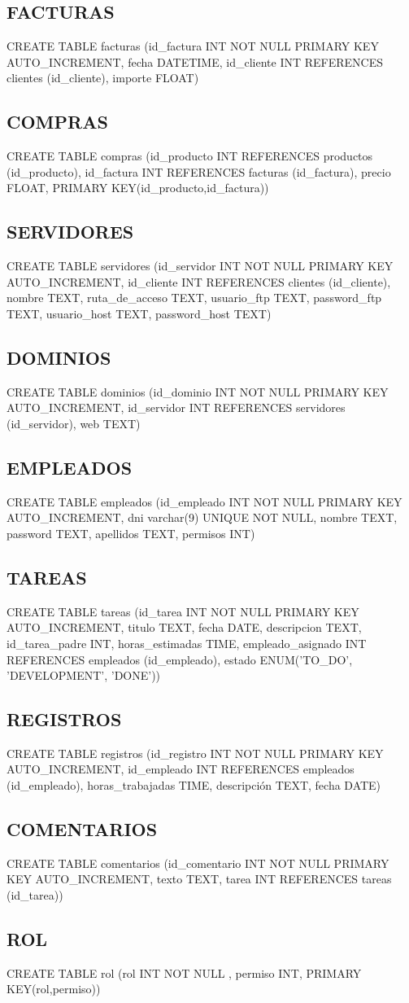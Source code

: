 \documentclass[paper=a4, fontsize=11pt, spanish]{scrartcl}
\begin{document}
\subsection{FACTURAS}
CREATE TABLE facturas (id\_factura INT NOT NULL PRIMARY KEY AUTO\_INCREMENT, fecha DATETIME, id\_cliente INT REFERENCES clientes (id\_cliente), importe FLOAT)

\subsection{COMPRAS}
CREATE TABLE compras (id\_producto INT REFERENCES productos (id\_producto), id\_factura INT REFERENCES facturas (id\_factura), precio FLOAT, PRIMARY KEY(id\_producto,id\_factura))

\subsection{SERVIDORES}
CREATE TABLE servidores (id\_servidor INT NOT NULL PRIMARY KEY AUTO\_INCREMENT, id\_cliente INT REFERENCES clientes (id\_cliente), nombre TEXT,  ruta\_de\_acceso TEXT, usuario\_ftp TEXT, password\_ftp TEXT, usuario\_host TEXT, password\_host TEXT)

\subsection{DOMINIOS}
CREATE TABLE dominios (id\_dominio INT NOT NULL PRIMARY KEY AUTO\_INCREMENT, id\_servidor INT REFERENCES servidores (id\_servidor), web TEXT)

\subsection{EMPLEADOS}
CREATE TABLE empleados (id\_empleado INT NOT NULL PRIMARY KEY AUTO\_INCREMENT, dni varchar(9) UNIQUE NOT NULL,  nombre TEXT, password TEXT, apellidos TEXT, permisos INT)

\subsection{TAREAS}
CREATE TABLE tareas (id\_tarea INT NOT NULL PRIMARY KEY AUTO\_INCREMENT, titulo TEXT, fecha DATE, descripcion TEXT, id\_tarea\_padre INT, horas\_estimadas TIME, empleado\_asignado INT REFERENCES empleados (id\_empleado), estado ENUM('TO_DO', 'DEVELOPMENT', 'DONE'))

\subsection{REGISTROS}
CREATE TABLE registros (id\_registro INT NOT NULL PRIMARY KEY AUTO\_INCREMENT, id\_empleado INT REFERENCES empleados (id\_empleado), horas\_trabajadas TIME, descripción TEXT, fecha DATE)

\subsection{COMENTARIOS}
CREATE TABLE comentarios (id\_comentario INT NOT NULL PRIMARY KEY AUTO\_INCREMENT, texto TEXT, tarea INT REFERENCES tareas (id\_tarea))

\subsection{ROL}
CREATE TABLE rol (rol INT NOT NULL , permiso INT, PRIMARY KEY(rol,permiso))
\end{document}
